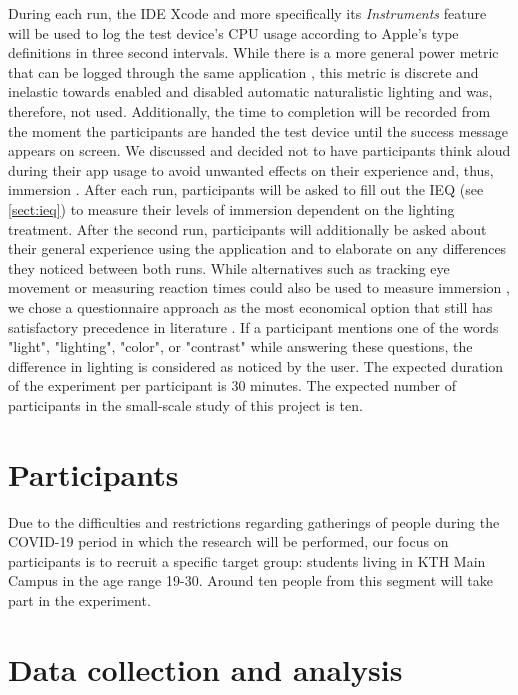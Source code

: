 \documentclass[12pt,twoside,english]{article}
\begin{document}
During each run, the IDE Xcode and more specifically its \textit{Instruments} feature \cite{apple_xcode_nodate} will be used to log the test device's \gls{CPU} usage according to Apple's type definitions \cite{apple_system_nodate} in three second intervals.
While there is a more general power metric that can be logged through the same application \cite{apple_energy_nodate-1}, this metric is discrete and inelastic towards enabled and disabled automatic naturalistic lighting and was, therefore, not used.
Additionally, the time to completion will be recorded from the moment the participants are handed the test device until the success message appears on screen.
We discussed and decided not to have participants think aloud during their app usage to avoid unwanted effects on their experience and, thus, immersion \cite{van_den_haak_retrospective_2003}.
After each run, participants will be asked to fill out the \gls{IEQ} (see \ref{sect:ieq}) to measure their levels of immersion dependent on the lighting treatment.
After the second run, participants will additionally be asked about their general experience using the application and to elaborate on any differences they noticed between both runs.
While alternatives such as tracking eye movement or measuring reaction times could also be used to measure immersion \cite{jennett_measuring_2008}, we chose a questionnaire approach as the most economical option that still has satisfactory precedence in literature \cite{boyle_engagement_2012}.
If a participant mentions one of the words "light", "lighting", "color", or "contrast" while answering these questions, the difference in lighting is considered as noticed by the user.
The expected duration of the experiment per participant is 30 minutes.
The expected number of participants in the small-scale study of this project is ten.


\section{Participants}
\label{sect:participants}

Due to the difficulties and restrictions regarding gatherings of people during the COVID-19 period in which the research will be performed, our focus on participants is to recruit a specific target group: students living in KTH Main Campus in the age range 19-30. Around ten people from this segment will take part in the experiment.


\section{Data collection and analysis}
\label{sect:data_collection_analysis}
\end{document}
